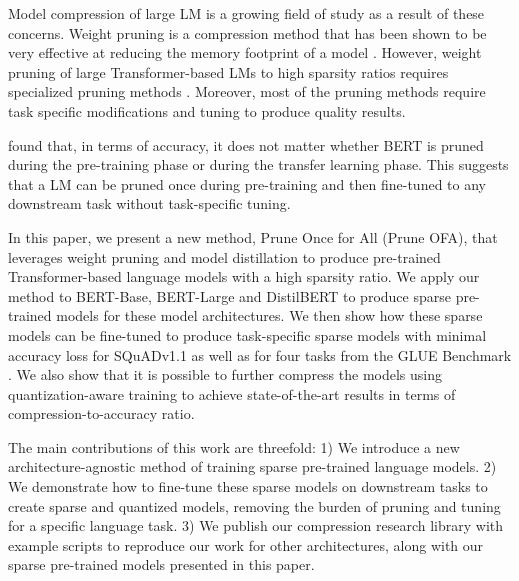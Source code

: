 \documentclass{article}
\begin{document}
Model compression of large LM is a growing field of study as a result of these concerns.
Weight pruning is a compression method that has been shown to be very effective at reducing the memory footprint of a model \citep{han2015imp, zhu2017prune}.
However, weight pruning of large Transformer-based LMs to high sparsity ratios requires specialized pruning methods \citep{sanh2020movement, chen2020lottery, gordon2020pre-train, lagunas2021block}.
Moreover, most of the pruning methods require task specific modifications and tuning to produce quality results.

\citet{gordon2020pre-train} found that, in terms of accuracy, it does not matter whether BERT is pruned during the pre-training phase or during the transfer learning phase.
This suggests that a LM can be pruned once during pre-training and then fine-tuned to any downstream task without task-specific tuning.

In this paper, we present a new method, Prune Once for All (Prune OFA), that leverages weight pruning and model distillation to produce pre-trained Transformer-based language models with a high sparsity ratio.
We apply our method to BERT-Base, BERT-Large and DistilBERT \citep{sanh2019distilbert} to produce sparse pre-trained models for these model architectures.
We then show how these sparse models can be fine-tuned to produce task-specific sparse models with minimal accuracy loss for SQuADv1.1 \citep{rajpurkar2016squad} as well as for four tasks from the GLUE Benchmark \citep{wang2018glue}.
We also show that it is possible to further compress the models using quantization-aware training to achieve state-of-the-art results in terms of compression-to-accuracy ratio.

The main contributions of this work are threefold: 
1) We introduce a new architecture-agnostic method of training sparse pre-trained language models.
2) We demonstrate how to fine-tune these sparse models on downstream tasks to create sparse and quantized models, removing the burden of pruning and tuning for a specific language task.
3) We publish our compression research library with example scripts to reproduce our work for other architectures, along with our sparse pre-trained models presented in this paper.
\end{document}
